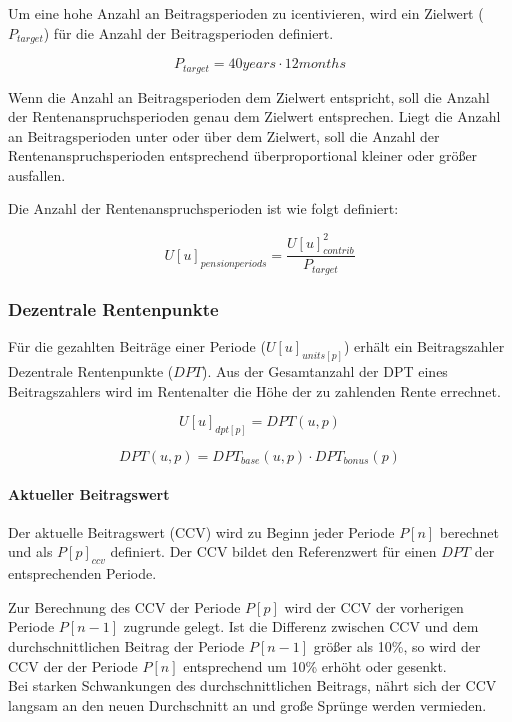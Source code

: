 Um eine hohe Anzahl an Beitragsperioden zu icentivieren, wird ein Zielwert ($P_{target}$)
für die Anzahl der Beitragsperioden definiert. 

\begin{equation}
	P_{target} = 40 years \cdot 12 months
\end{equation}

Wenn die Anzahl an Beitragsperioden dem Zielwert entspricht, soll die Anzahl der 
Rentenanspruchsperioden genau dem Zielwert entsprechen. Liegt die  Anzahl an
Beitragsperioden unter oder über dem Zielwert, soll die Anzahl der 
Rentenanspruchsperioden entsprechend überproportional kleiner oder größer ausfallen.  

Die Anzahl der Rentenanspruchsperioden ist wie folgt definiert:

\begin{equation}
U[u]_{pensionperiods} = \frac{U[u]_{contrib}^2}{P_{target}}
\end{equation}


\subsubsection*{Dezentrale Rentenpunkte}
Für die gezahlten Beiträge einer Periode ($U[u]_{units[p]}$) erhält ein Beitragszahler Dezentrale Rentenpunkte
($DPT$). Aus der Gesamtanzahl der DPT eines Beitragszahlers wird im Rentenalter
die Höhe der zu zahlenden Rente errechnet.

\begin{equation}
U[u]_{dpt[p]} = DPT(u, p)
\end{equation}

\begin{equation}
DPT(u, p) = DPT_{base}(u, p) \cdot DPT_{bonus}(p)
\end{equation}

\paragraph*{Aktueller Beitragswert}
Der aktuelle Beitragswert (CCV) wird zu Beginn jeder Periode 
$P[n]$ berechnet und als $P[p]_{ccv}$ definiert. Der CCV bildet den Referenzwert für einen $DPT$ der
entsprechenden Periode.

Zur Berechnung des CCV der Periode $P[p]$ wird der CCV der vorherigen
Periode $P[n-1]$ zugrunde gelegt. Ist die Differenz zwischen CCV und dem
durchschnittlichen Beitrag der Periode $P[n-1]$ größer als 10\%, so wird
der CCV der der Periode $P[n]$ entsprechend um 10\% erhöht oder gesenkt.\\
Bei starken Schwankungen des durchschnittlichen Beitrags, nährt sich der CCV langsam an den neuen Durchschnitt an und große Sprünge werden vermieden.



